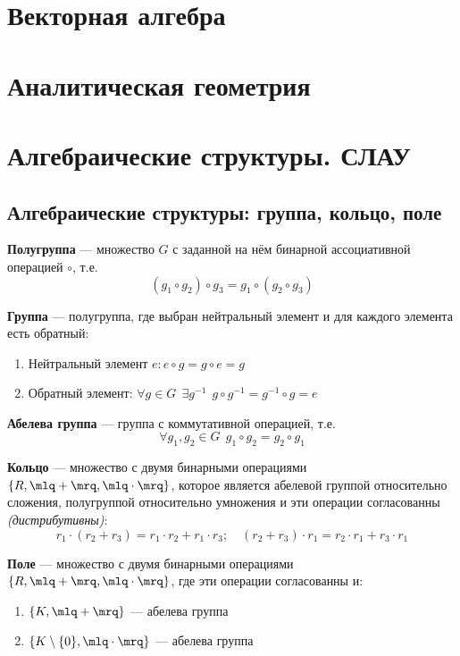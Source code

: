 

\cfoot{}


\newcommand{\doref}[1]{Дано выше. \textit{(\ref{#1}, стр. \pageref{#1})}}
\setlength{\parindent}{0pt}


\section{Векторная алгебра}
\section{Аналитическая геометрия}
\section{Алгебраические структуры. СЛАУ}
\subsection{Алгебраические структуры: группа, кольцо, поле}
\begin{definition}
    \textbf{Полугруппа} --- множество $G$ с заданной на нём бинарной ассоциативной операцией $\circ$, т.е. $$(g_1\circ g_2)\circ g_3 = g_1\circ (g_2 \circ g_3)$$
\end{definition}
\begin{definition}
    \textbf{Группа} --- полугруппа, где выбран нейтральный элемент и для каждого элемента есть обратный:
    \begin{enumerate}
        \item Нейтральный элемент $e: e\circ g=g\circ e=g$
        \item Обратный элемент: $\forall g\in G \ \ \exists g^{-1} \ \ g\circ g^{-1}=g^{-1}\circ g=e$
    \end{enumerate}
\end{definition}
\begin{definition}
    \textbf{Абелева группа} --- группа с коммутативной операцией, т.е. $$\forall g_1, g_2\in G \ \ g_1\circ g_2=g_2\circ g_1$$
\end{definition}
\begin{definition}
    \textbf{Кольцо} --- множество с двумя бинарными операциями $\{R, \mlq+\mrq, \mlq\cdot\mrq\}$, которое является абелевой группой относительно сложения, полугруппой относительно умножения и эти операции согласованны \textit{(дистрибутивны)}:
    $$r_1\cdot(r_2+r_3)=r_1\cdot r_2+r_1\cdot r_3;\quad (r_2+r_3)\cdot r_1=r_2\cdot r_1+r_3\cdot r_1$$
\end{definition}
\begin{definition}
    \textbf{Поле} --- множество с двумя бинарными операциями $\{R, \mlq+\mrq, \mlq\cdot\mrq\}$, где эти операции согласованны и:
    \begin{enumerate}
        \item $\{K, \mlq + \mrq\}$ --- абелева группа
        \item $\{K\setminus\{0\}, \mlq \cdot \mrq\}$ --- абелева группа
    \end{enumerate}
\end{definition}
